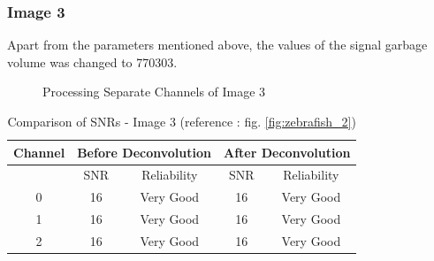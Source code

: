\documentclass{article}
\begin{document}
\subsubsection*{Image 3}
Apart from the parameters mentioned above, the values of the signal garbage volume was changed to 770303. 
\begin{figure}[h!]
\centering
{}
\vspace{5 mm}
\caption{Processing Separate Channels of Image 3}
\label{fig:tuning-image3}
\end{figure}
\begin{table}[h!]
\centering
\caption{Comparison of SNRs - Image 3 (reference : fig. \ref{fig:zebrafish_2})}
\begin{tabular}{*5c}
\toprule
Channel &  \multicolumn{2}{c}{Before Deconvolution} & \multicolumn{2}{c}{After Deconvolution}\\
\midrule
{}   & SNR   & Reliability    & SNR   & Reliability \\
0   &  16 & Very Good & 16 & Very Good \\
1   &  16 & Very Good & 16 & Very Good \\
2   &  16 & Very Good & 16 & Very Good \\
\bottomrule
\end{tabular}
\end{table}
\end{document}
